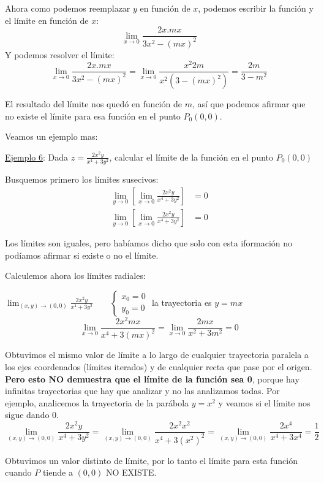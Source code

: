 \documentclass[12pt]{article}
\begin{document}
Ahora como podemos reemplazar $ y $ en función de $ x $, podemos escribir la función y el límite en función de $ x $:
\[
\lim_{x \to 0}{\frac{2x.mx}{3x^{2} - (mx)^{2}}}
\]
Y podemos resolver el límite:
\[
\lim_{x \to 0}{\frac{2x.mx}{3x^{2} - (mx)^{2}}} = \lim_{x \to 0}{\frac{x^{2}2m}{x^{2}(3- (mx)^{2})}} = \frac{2m}{3-m^{2}}
\]

El resultado del límite nos quedó en función de $ m $, así que podemos afirmar que no existe el límite para esa función en el punto $ P_{0}(0,0) $.

Veamos un ejemplo mas:

\underline{Ejemplo 6}:
Dada $ z = \frac{2x^{2}y}{x^{4}+3y^{2}} $, calcular el límite de la función en el punto $ P_{0}(0,0) $

Busquemos primero los límites susecivos:
\begin{align*}
	\lim_{y \to 0}{\left[\lim_{x \to 0}{\frac{2x^{2}y}{x^{4}+3y^{2}}}\right]} &= 0 \\
	\lim_{y \to 0}{\left[\lim_{x \to 0}{\frac{2x^{2}y}{x^{4}+3y^{2}}}\right]} &= 0
\end{align*}

Los límites son iguales, pero habíamos dicho que solo con esta iformación no podíamos afirmar si existe o no el límite.

Calculemos ahora los límites radiales:
 
$
\displaystyle \lim_{(x,y) \to (0,0)}{\frac{2x^{2}y}{x^{4}+3y^{2}}}
\qquad
\begin{cases}
  x_{0} = 0 \\
  y_{0} = 0
\end{cases}
$ la trayectoria es $ y = mx $
\[
\lim_{x \to 0}{\frac{2x^{2}mx}{x^{4}+3(mx)^{2}}} = \lim_{x \to 0}{\frac{2mx}{x^{2}+3m^{2}}} = 0
\]

Obtuvimos el mismo valor de límite a lo largo de cualquier trayectoria paralela a los ejes coordenados (límites iterados) y de cualquier recta que pase por el origen. \textbf{Pero esto NO demuestra que el límite de la función sea 0}, porque hay infinitas trayectorias que hay que analizar y no las analizamos todas. Por ejemplo, analicemos la trayectoria de la parábola $ y = x^{2} $ y veamos si el límite nos sigue dando 0.
\[
	\lim_{(x,y) \to (0,0)}{\frac{2x^{2}y}{x^{4}+3y^{2}}} =\lim_{(x,y) \to (0,0)}{\frac{2x^{2}x^{2}}{x^{4}+3(x^{2})^{2}}} = \lim_{(x,y) \to (0,0)}{\frac{2x^{4}}{x^{4}+3x^{4}}} = \frac{1}{2}
\]

Obtuvimos un valor distinto de límite, por lo tanto el límite para esta función cuando $ P $ tiende a $ (0,0) $ NO EXISTE.
\end{document}
